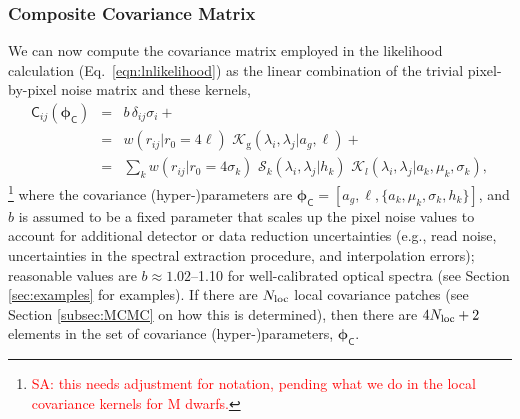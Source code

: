 \documentclass[iop,floatfix]{emulateapj}
\newcommand{\vC}{\mathsf{C}}
\newcommand{\vp}{ {\bm \phi}}
\newcommand{\cov}{ \vp_{\mathsf{C}}}
\newcommand{\KK}{\mathcal{K}}
\newcommand{\Kglobal}{\KK_{\textrm{g}}}
\newcommand{\Klocal}{\KK_l}
\newcommand{\comm}[1]{ \textcolor{red}{SA: #1}}
\begin{document}
\subsubsection{Composite Covariance Matrix}

We can now compute the covariance matrix employed in the likelihood calculation 
(Eq.~\ref{eqn:lnlikelihood}) as the linear combination of the trivial pixel-by-pixel noise matrix 
and these kernels, 
\begin{eqnarray}
\vC_{ij}(\cov)  &=& b \, \delta_{ij}\sigma_i + \\ \nonumber
                &=& w(r_{ij}|r_0 = 4\ell) \,\, \Kglobal(\lambda_i, \lambda_j|a_g, \ell) + \\ \nonumber
                &=& \sum_k w(r_{ij}|r_0 = 4\sigma_k) \,\, \mathcal{S}_k(\lambda_i,\lambda_j | h_k) \,\, \Klocal(\lambda_i, \lambda_j | a_k, \mu_k, \sigma_k),
\end{eqnarray}
\footnote{\comm{this needs adjustment for notation, pending what we do in the local covariance kernels for M dwarfs.}}
where the covariance (hyper-)parameters are $\cov = [a_g, \ell, \{a_k, \mu_k, \sigma_k, h_k\}]$, 
and $b$ is assumed to be a fixed parameter that scales up the pixel noise values to account for 
additional detector or data reduction uncertainties (e.g., read noise, uncertainties in the 
spectral extraction procedure, and interpolation errors); reasonable values are $b \approx 
1.02$--1.10 for well-calibrated optical spectra (see Section \ref{sec:examples} for examples).  If 
there are $N_{\rm loc}$ local covariance patches (see Section \ref{subsec:MCMC} on how this is 
determined), then there are $4N_{\rm loc}+2$ elements in the set of covariance (hyper-)parameters, 
$\cov$.  
\end{document}
